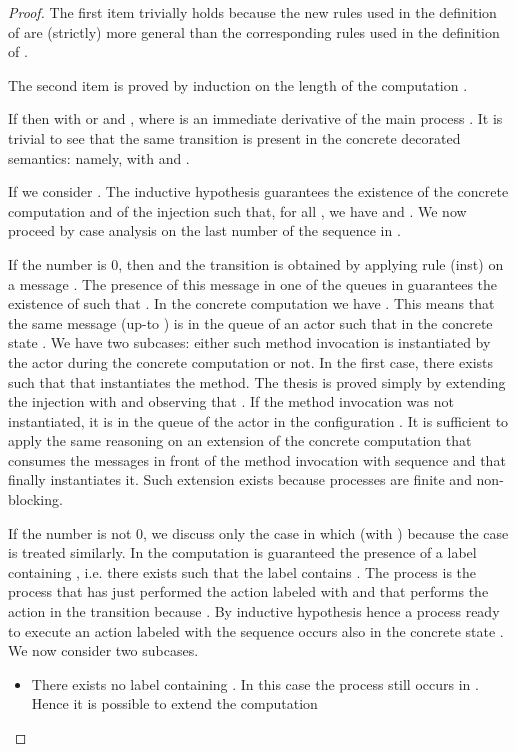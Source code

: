 \documentclass{LMCS}
\theoremstyle{plain}\newtheorem{proposition}[thm]{Proposition}
\theoremstyle{plain}\newtheorem{lemma}[thm]{Lemma}
\theoremstyle{plain}\newtheorem{theorem}[thm]{Theorem}
\theoremstyle{plain}\newtheorem{corollary}[thm]{Corollary}
\newcommand{\rulename}[1]{{\sc(#1)}}
\begin{document}
\begin{proof}
The first item trivially holds because the new
rules used in the definition of 
are (strictly) more general than the corresponding
rules used in the definition of .

The second item is proved by induction on the length of the computation 
.

If  then 
with  or  
and , where 
is an immediate derivative of the main process .
It is trivial to see that the same transition
is present in the concrete decorated semantics:
namely,  with 
 and 
.

If 
we consider . 
The inductive hypothesis guarantees the existence of the concrete computation 
 and of the injection  
such that, for all , 
we have  and 
.
We now proceed by case analysis on the last number of the sequence
in .

If the number is 0, then  and the transition is obtained
by applying rule \rulename{inst}
on a message .
The presence of this message in one of the queues in 
guarantees the existence of 
such that .
In the concrete computation we have .
This means that the same message (up-to ) is in the 
queue of an actor  such that  in the concrete state .
We have two subcases: either such method invocation
is instantiated by the actor  during the concrete
computation 
or not. In the first case, there exists  such that 
 that instantiates
the method. The thesis is proved simply by extending the injection
 with  and observing that .
If the method invocation was not instantiated, it is in the
queue of the actor  in the configuration . It is sufficient
to apply the same reasoning on an extension of the concrete computation
that consumes the messages in front of the method invocation with sequence 
and that finally instantiates it.
Such extension exists because processes are finite and non-blocking.

If the number is not 0, we discuss only the case in which 
(with )
because the case  is treated similarly.
In the computation  is guaranteed the presence of a label
containing , i.e.
there exists  such that 
the label  contains .
The process  is the process
that has just performed the action labeled with 
and that performs the action in the transition 
because .
By inductive hypothesis 
hence a process ready to execute an action labeled with the sequence 
occurs also in the concrete state .
We now consider two subcases.
\begin{itemize}
\item
There exists no label 
containing .
In this case 
the process 
still occurs in .
Hence it is possible to extend the computation 


\end{itemize}
\end{proof}
\end{document}
